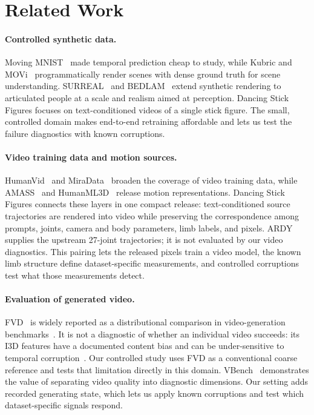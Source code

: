 \documentclass[10pt,twocolumn,letterpaper]{article}
\begin{document}
\section{Related Work}

\paragraph{Controlled synthetic data.} Moving MNIST~\cite{srivastava2015unsupervised} made temporal
prediction cheap to study, while Kubric and MOVi~\cite{greff2022kubric} programmatically render scenes with
dense ground truth for scene understanding. SURREAL~\cite{varol2017surreal} and BEDLAM~\cite{black2023bedlam}
extend synthetic rendering to articulated people at a scale and realism aimed at perception. Dancing Stick
Figures focuses on text-conditioned videos of a single stick figure. The small, controlled domain makes
end-to-end retraining affordable and lets us test the failure diagnostics with known corruptions.

\paragraph{Video training data and motion sources.} HumanVid~\cite{wang2024humanvid} and
MiraData~\cite{ju2024miradata} broaden the coverage of video training data, while
AMASS~\cite{mahmood2019amass} and HumanML3D~\cite{guo2022humanml3d} release motion representations. Dancing
Stick Figures connects these layers in one compact release: text-conditioned source trajectories are
rendered into video while preserving the correspondence among prompts, joints, camera and body parameters,
limb labels, and pixels. ARDY~\cite{zhao2026ardy} supplies the upstream 27-joint trajectories; it is not
evaluated by our video diagnostics. This pairing lets the released pixels train a video model, the known
limb structure define dataset-specific measurements, and controlled corruptions test what those measurements
detect.

\paragraph{Evaluation of generated video.} FVD~\cite{unterthiner2018fvd} is widely reported as a
distributional comparison in video-generation benchmarks~\cite{ho2022vdm}. It is not a
diagnostic of whether an individual video succeeds: its I3D features have a documented content bias and can
be under-sensitive to temporal corruption~\cite{ge2024fvdbias}. Our controlled study uses FVD as a
conventional coarse reference and tests that limitation directly in this domain.
VBench~\cite{huang2023vbench} demonstrates the value of separating video quality into diagnostic dimensions.
Our setting adds recorded generating state, which lets us apply known corruptions and test which
dataset-specific signals respond.
\end{document}

